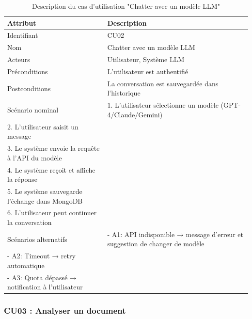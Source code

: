 \begin{table}[H]
\centering
\caption{Description du cas d'utilisation "Chatter avec un modèle LLM"}
\label{tab:cu-chat}
\begin{tabular}{|l|p{10cm}|}
\hline
\textbf{Attribut} & \textbf{Description} \\
\hline
Identifiant & CU02 \\
\hline
Nom & Chatter avec un modèle LLM \\
\hline
Acteurs & Utilisateur, Système LLM \\
\hline
Préconditions & L'utilisateur est authentifié \\
\hline
Postconditions & La conversation est sauvegardée dans l'historique \\
\hline
Scénario nominal & 
1. L'utilisateur sélectionne un modèle (GPT-4/Claude/Gemini)\\
2. L'utilisateur saisit un message\\
3. Le système envoie la requête à l'API du modèle\\
4. Le système reçoit et affiche la réponse\\
5. Le système sauvegarde l'échange dans MongoDB\\
6. L'utilisateur peut continuer la conversation \\
\hline
Scénarios alternatifs & 
- A1: API indisponible → message d'erreur et suggestion de changer de modèle\\
- A2: Timeout → retry automatique\\
- A3: Quota dépassé → notification à l'utilisateur \\
\hline
\end{tabular}
\end{table}

\subsubsection{CU03 : Analyser un document}

